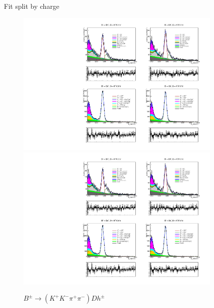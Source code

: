 \documentclass{beamer}
\begin{document}
\begin{frame}{Fit split by charge}
  \begin{figure}
    \centering
    \includegraphics[width = 0.9\textwidth, clip = true, trim = {0 12.9cm 0 0}]{Plots/d2kkpipi_fiveL_allDP_GLW.pdf}
    \includegraphics[width = 0.9\textwidth, clip = true, trim = {0 3cm 0 10cm}]{Plots/d2kkpipi_fiveL_allDP_GLW.pdf}
    \caption{$B^\pm\to (K^+K^-\pi^+\pi^-)Dh^\pm$}
  \end{figure}
\end{frame}
\end{document}
